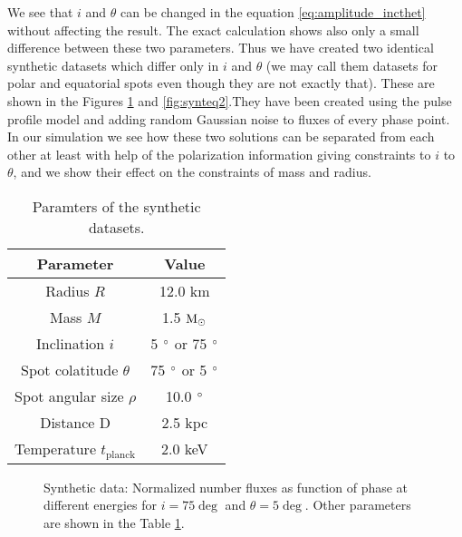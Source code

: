 \documentclass{wihuri}
\def\msun{{\rm M_{\odot}}}
\begin{document}
We see that $i$ and $\theta$ can be changed in the equation \ref{eq:amplitude_incthet} without affecting the result. The exact calculation shows also only a small difference between these two parameters. Thus we have created two identical synthetic datasets which differ only in $i$ and $\theta$ (we may call them datasets for polar and equatorial spots even though they are not exactly that). These are shown in the Figures \ref{fig:syntpol2} and \ref{fig:synteq2}.They have been created using the pulse profile model and adding random Gaussian noise to fluxes of every phase point. In our simulation we see how these two solutions can be separated from each other at least with help of the polarization information giving constraints to $i$ to $\theta$, and we show their effect on the constraints of mass and radius. 




\begin{center}
\begin{table}
  \caption{Paramters of the synthetic datasets.}
\label{table:params}
\begin{center}
  \begin{tabular}{| c | c |}
    \hline
     Parameter & Value\\ \hline
      Radius $R$ & 12.0 km  \\ \hline
      Mass $M$ & 1.5 $\msun$  \\ \hline
      Inclination $i$ & 5 $\degree$ or 75 $\degree$ \\ \hline
      Spot colatitude $\theta$ & 75 $\degree$ or 5 $\degree$ \\ \hline
      Spot angular size $\rho$ & 10.0 $\degree$  \\ \hline
      Distance D & 2.5 kpc \\ \hline
      Temperature $t_{\mathrm{planck}}$ & 2.0 keV \\

    \hline
  \end{tabular}
  \end{center} 

  \end{table}
\end{center} 



%



\begin{figure}
\centerline{}
\caption{Synthetic data: Normalized number fluxes as function of phase at different energies for $i = 75 \deg$ and $\theta = 5 \deg$. Other parameters are shown in the Table \ref{table:params}.
\label{fig:syntpol2}}
\end{figure}
\end{document}
